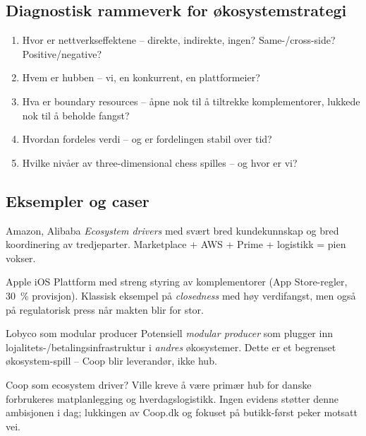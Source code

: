 \subsection{Diagnostisk rammeverk for økosystemstrategi}
\begin{enumerate}
  \item Hvor er nettverkseffektene -- direkte, indirekte, ingen?
    Same-/cross-side? Positive/negative?
  \item Hvem er hubben -- vi, en konkurrent, en plattformeier?
  \item Hva er boundary resources -- åpne nok til å tiltrekke
    komplementorer, lukkede nok til å beholde fangst?
  \item Hvordan fordeles verdi -- og er fordelingen stabil over tid?
  \item Hvilke nivåer av \guillemotleft{}three-dimensional chess\guillemotright{} spilles -- og hvor er vi?
\end{enumerate}

\subsection{Eksempler og caser}
\begin{eksempelboks}{Amazon, Alibaba}
\emph{Ecosystem drivers} med svært bred kundekunnskap og bred koordinering
av tredjeparter. Marketplace + AWS + Prime + logistikk = pien vokser.
\end{eksempelboks}

\begin{eksempelboks}{Apple iOS}
Plattform med streng styring av komplementorer (App Store-regler,
30~\% provisjon). Klassisk eksempel på \emph{closedness} med høy verdifangst,
men også på regulatorisk press når makten blir for stor.
\end{eksempelboks}

\begin{eksempelboks}{Lobyco som modular producer}
Potensiell \emph{modular producer} som plugger inn
lojalitets-/betalingsinfrastruktur i \emph{andres} økosystemer. Dette er et
begrenset økosystem-spill -- Coop blir leverandør, ikke hub.
\end{eksempelboks}

\begin{eksempelboks}{Coop som ecosystem driver?}
Ville kreve å være primær hub for danske forbrukeres matplanlegging og
hverdagslogistikk. Ingen evidens støtter denne ambisjonen i dag; lukkingen
av Coop.dk og fokuset på butikk-først peker motsatt vei.
\end{eksempelboks}

